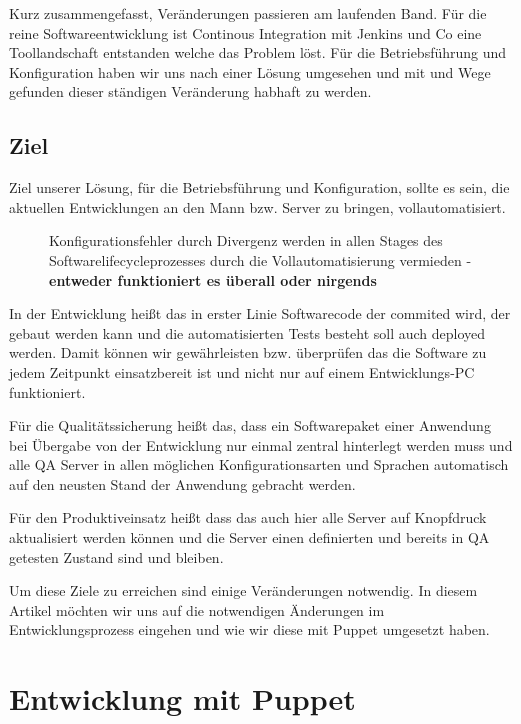 \documentclass[12pt,a4paper,ngerman]{article}
\begin{document}
Kurz zusammengefasst, Veränderungen passieren am laufenden Band. Für die reine Softwareentwicklung ist Continous Integration mit Jenkins und Co eine Toollandschaft entstanden welche das Problem löst. Für die Betriebsführung und Konfiguration haben wir uns nach einer Lösung umgesehen und mit \cite{puppet} und \cite{chef} Wege gefunden dieser ständigen Veränderung habhaft zu werden.

\subsection{Ziel}

Ziel unserer Lösung, für die Betriebsführung und Konfiguration, sollte es sein, die aktuellen Entwicklungen an den Mann bzw. Server zu bringen, vollautomatisiert. 
\begin{figure}
\vspace{-10pt}
\begin{boxedminipage}{5cm}
Konfigurationsfehler durch Divergenz werden in allen Stages des Softwarelifecycleprozesses durch die Vollautomatisierung vermieden - \textbf{entweder funktioniert es überall oder nirgends}
\end{boxedminipage}
\vspace{-10pt}
\end{figure}
 In der Entwicklung heißt das in erster Linie Softwarecode der commited wird, der gebaut werden kann und die automatisierten Tests besteht soll auch deployed werden. Damit können wir gewährleisten bzw. überprüfen das die Software zu jedem Zeitpunkt einsatzbereit ist und nicht nur auf einem Entwicklungs-PC funktioniert.

Für die Qualitätssicherung heißt das, dass ein Softwarepaket einer Anwendung bei Übergabe von der Entwicklung nur einmal zentral hinterlegt werden muss und alle QA Server in allen möglichen Konfigurationsarten und Sprachen automatisch auf den neusten Stand der Anwendung gebracht werden.

Für den Produktiveinsatz heißt dass das auch hier alle Server auf Knopfdruck aktualisiert werden können und die Server einen definierten und bereits in QA getesten Zustand sind und bleiben. 

Um diese Ziele zu erreichen sind einige Veränderungen notwendig. In diesem Artikel möchten wir uns auf die notwendigen Änderungen im Entwicklungsprozess eingehen und wie wir diese mit Puppet umgesetzt haben.

\section{Entwicklung mit Puppet}
\end{document}
